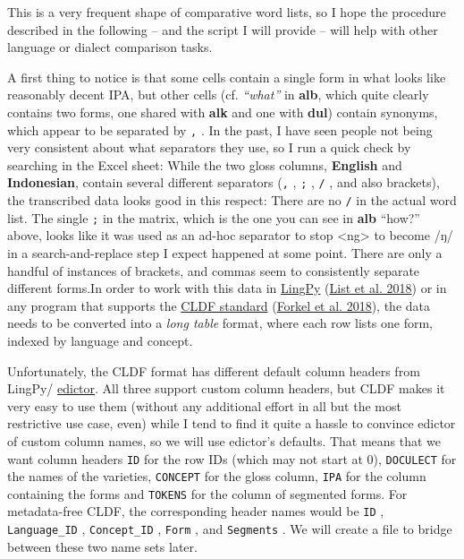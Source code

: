 \documentclass[
  a4paper,
  14pt,
  oneside,
  tablecaptionabove
]{scrbook}
\begin{document}
This is a very frequent shape of comparative word lists, so I hope the
procedure described in the following -- and the script I will provide --
will help with other language or dialect comparison tasks.

A first thing to notice is that some cells contain a single form in what
looks like reasonably decent IPA, but other cells (cf.
\emph{\enquote{what}} in \textbf{alb}, which quite clearly contains two
forms, one shared with \textbf{alk} and one with \textbf{dul}) contain
synonyms, which appear to be separated by \lstinline!,! . In the past, I
have seen people not being very consistent about what separators they
use, so I run a quick check by searching in the Excel sheet: While the
two gloss columns, \textbf{English} and \textbf{Indonesian}, contain
several different separators (\lstinline!,! , \lstinline!;! ,
\lstinline!/! , and also brackets), the transcribed data looks good in
this respect: There are no \lstinline!/! in the actual word list. The
single \lstinline!;! in the matrix, which is the one you can see in
\textbf{alb} \enquote{how?} above, looks like it was used as an ad-hoc
separator to stop \textless{}ng\textgreater{} to become /ŋ/ in a
search-and-replace step I expect happened at some point. There are only
a handful of instances of brackets, and commas seem to consistently
separate different forms.In order to work with this data in
\href{http://lingpy.org/}{LingPy} (\href{http://lingpy.org}{List et al.
2018}) or in any program that supports the
\href{https://zenodo.org/record/1252097}{CLDF standard} (\href{https://cldf.clld.org}{Forkel et al. 2018}), the data needs to be
converted into a \emph{long table} format, where each row lists one
form, indexed by language and concept.

Unfortunately, the CLDF format has different default column headers from
LingPy/ \href{http://edictor.digling.org}{edictor}.  All three support
custom column headers, but CLDF makes it very easy to use them (without
any additional effort in all but the most restrictive use case, even)
while I tend to find it quite a hassle to convince edictor of custom
column names, so we will use edictor's defaults. That means that we want
column headers \lstinline!ID! for the row IDs (which may not start at
0), \lstinline!DOCULECT! for the names of the varieties,
\lstinline!CONCEPT! for the gloss column, \lstinline!IPA! for the column
containing the forms and \lstinline!TOKENS! for the column of segmented
forms. For metadata-free CLDF, the corresponding header names would be
\lstinline!ID! , \lstinline!Language_ID! , \lstinline!Concept_ID! ,
\lstinline!Form! , and \lstinline!Segments! . We will create a file to
bridge between these two name sets later.
\end{document}
